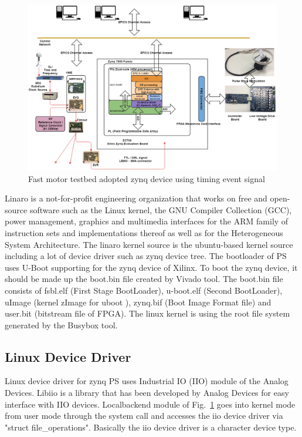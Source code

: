 \documentclass[a4paper,
              ]{jacow}
\begin{document}
\begin{figure}[!tbh]
	\centering
	\includegraphics*[width=\textwidth,height=0.7\textwidth]{motor-testbed}
	\caption{Fast motor testbed adopted zynq device using timing event signal}
	\label{stepper}
\end{figure}

Linaro\cite{linaro} is a not-for-profit engineering organization that works on free and open-source software such as the Linux kernel, the GNU Compiler Collection (GCC), power management, graphics and multimedia interfaces for the ARM family of instruction sets and implementations thereof as well as for the Heterogeneous System Architecture.  
The linaro kernel source is the ubuntu-based kernel source including a lot of device driver such as zynq device tree.
The bootloader of PS uses U-Boot\cite{u-boot} supporting for the zynq device of Xilinx. To boot the zynq device, it should be made up the boot.bin file created by Vivado\cite{vivado} tool. The boot.bin\cite{boot-bin} file consists of fsbl.elf (First Stage BootLoader), u-boot.elf (Second BootLoader), uImage (kernel zImage for uboot ), zynq.bif (Boot Image Format file) and user.bit (bitstream file of FPGA). The linux kernel is using the root file system generated by the Busybox\cite{busybox} tool.

\subsection{Linux Device Driver}
Linux device driver for zynq PS uses Industrial IO (IIO) module of the Analog Devices. Libiio\cite{iio} is a library that has been developed by Analog Devices for easy interface with IIO devices. Localbackend module of Fig.~\ref{stepper} goes into kernel mode from user mode through the system call and accesses the iio device driver via "struct file\_operations". Basically the iio device driver is a character device type.
\end{document}
